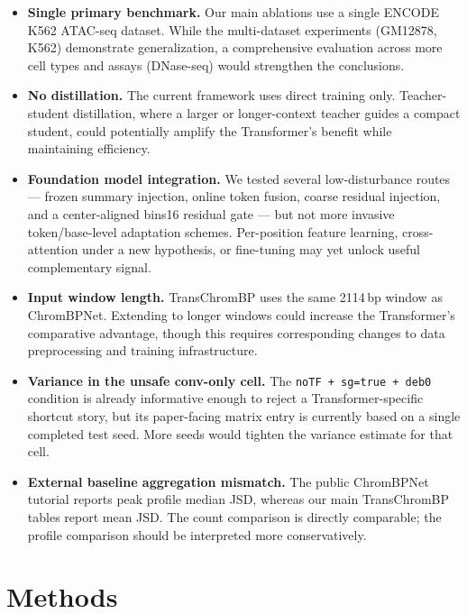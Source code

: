 \documentclass[11pt,a4paper]{article}
\begin{document}
\begin{itemize}[leftmargin=2em]
  \item \textbf{Single primary benchmark.} Our main ablations use a
  single ENCODE K562 ATAC-seq dataset. While the multi-dataset
  experiments (GM12878, K562) demonstrate generalization, a comprehensive
  evaluation across more cell types and assays (DNase-seq) would
  strengthen the conclusions.

  \item \textbf{No distillation.} The current framework uses direct
  training only. Teacher-student distillation, where a larger or
  longer-context teacher guides a compact student, could potentially
  amplify the Transformer's benefit while maintaining efficiency.

  \item \textbf{Foundation model integration.} We tested several
  low-disturbance routes --- frozen summary injection, online token
  fusion, coarse residual injection, and a center-aligned bins16
  residual gate --- but not more invasive token/base-level adaptation
  schemes. Per-position feature learning, cross-attention under a new
  hypothesis, or fine-tuning may yet unlock useful complementary signal.

  \item \textbf{Input window length.} TransChromBP uses the same 2114\,bp
  window as ChromBPNet. Extending to longer windows could increase the
  Transformer's comparative advantage, though this requires corresponding
  changes to data preprocessing and training infrastructure.

  \item \textbf{Variance in the unsafe conv-only cell.} The
  \texttt{noTF + sg=true + deb0} condition is already informative enough
  to reject a Transformer-specific shortcut story, but its paper-facing
  matrix entry is currently based on a single completed test seed. More
  seeds would tighten the variance estimate for that cell.

  \item \textbf{External baseline aggregation mismatch.} The public
  ChromBPNet tutorial reports peak profile median JSD, whereas our main
  TransChromBP tables report mean JSD. The count comparison is directly
  comparable; the profile comparison should be interpreted more
  conservatively.
\end{itemize}

\section{Methods}
\label{sec:methods}
\end{document}
